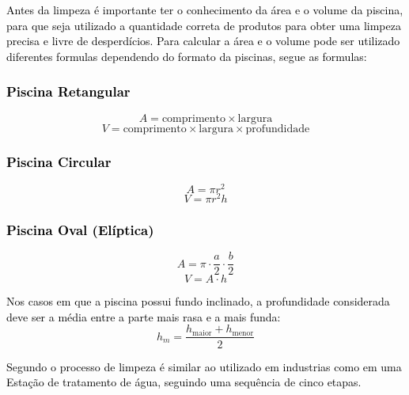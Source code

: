         \textcolor{black}{Antes da limpeza é importante ter o conhecimento da área e o volume da piscina, para que seja utilizado a quantidade correta de produtos para obter uma limpeza precisa e livre de desperdícios. Para calcular a área e o volume pode ser utilizado diferentes formulas dependendo do formato da piscinas, segue as formulas:}

        \subsubsection*{\textcolor{black}{Piscina Retangular}}
        
            \[
            A = \text{comprimento} \times \text{largura}
            \]
            \[
            V = \text{comprimento} \times \text{largura} \times \text{profundidade}
            \]
            
        \subsubsection*{\textcolor{black}{Piscina Circular}}
            \[
            A = \pi r^2
            \]
            \[
            V = \pi r^2 h
            \]
            
        \subsubsection*{\textcolor{black}{Piscina Oval (Elíptica)}}
            \[
            A = \pi \cdot \frac{a}{2} \cdot \frac{b}{2}
            \]
            \[
            V = A \cdot h
            \]
            
            \textcolor{black}{Nos casos em que a piscina possui fundo inclinado, a profundidade considerada deve ser a média entre a parte mais rasa e a mais funda:}
            \[
            h_m = \frac{h_{\text{maior}} + h_{\text{menor}}}{2}
            \]
            

        \textcolor{black}{Segundo \cite{tccSilva} o processo de limpeza é similar ao utilizado em industrias como em uma Estação de tratamento de água, seguindo uma sequência de cinco etapas.}

